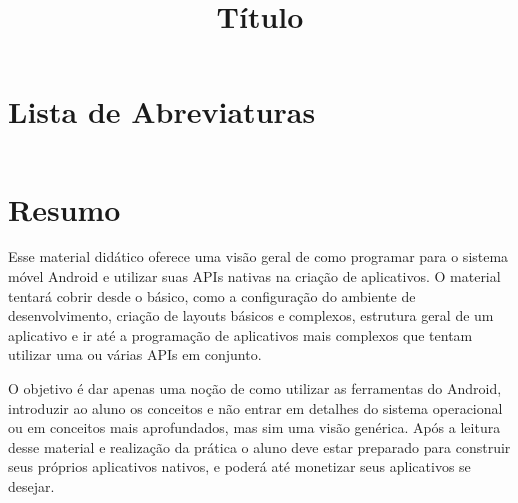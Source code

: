 \documentclass[a4paper,12pt,brazil,doubleside]{book}
\title{Título}
\begin{document}


\pagestyle{empty}

\cleardoublepage

\onehalfspace

\pagestyle{plain}

\setcounter{tocdepth}{1} %
\tableofcontents
\clearpage %
\thispagestyle{empty}

\listoffigures
{}
\clearpage %
\thispagestyle{empty}

\listoftables
{}
\clearpage %
\thispagestyle{empty}

\lstlistoflistings
{}
\clearpage %
\thispagestyle{empty}

\chapter*{Lista de Abreviaturas}
\begin{longtable}{ll}
\end{longtable}


\renewcommand\lstlistingname{Algorithm}
\renewcommand\lstlistlistingname{Algorithms}

\chapter*{Resumo}

\begin{singlespace}
Esse material didático oferece uma visão geral de como programar para o sistema móvel Android e utilizar suas APIs nativas na criação de aplicativos. O material tentará cobrir desde o básico, como a configuração do ambiente de desenvolvimento, criação de layouts básicos e complexos, estrutura geral de um aplicativo e ir até a programação de aplicativos mais complexos que tentam utilizar uma ou várias APIs em conjunto.

O objetivo é dar apenas uma noção de como utilizar as ferramentas do Android, introduzir ao aluno os conceitos e não entrar em detalhes do sistema operacional ou em conceitos mais aprofundados, mas sim uma visão genérica.
Após a leitura desse material e realização da prática o aluno deve estar preparado para construir seus próprios aplicativos nativos, e poderá até monetizar seus aplicativos se desejar.
\end{singlespace}
\end{document}
